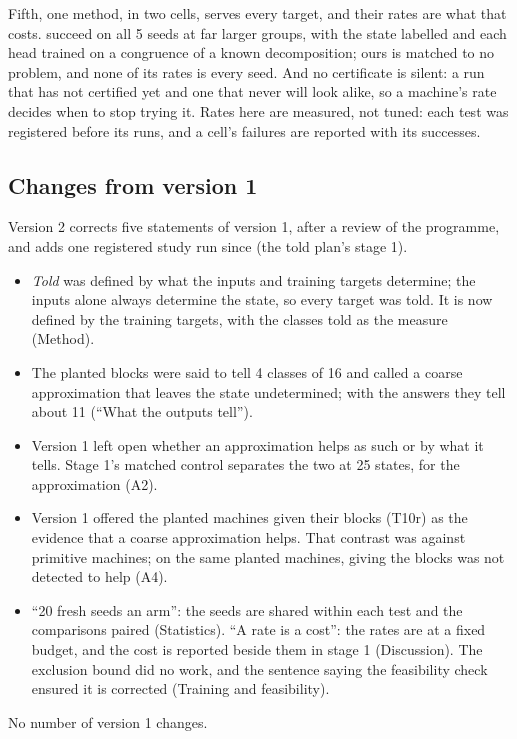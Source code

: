 \documentclass[11pt]{article}
\begin{document}
Fifth, one method, in two cells, serves every target, and their rates are what that costs.
\citet{brandoit-2026-length-independent-state-tracking} succeed on all 5 seeds at far larger groups,
with the state labelled and each head trained on a congruence of a known decomposition; ours is matched to no problem,
and none of its rates is every seed. And no certificate is silent: a run that has not certified yet
and one that never will look alike, so a machine's rate decides when to stop trying it. Rates here
are measured, not tuned: each test was registered before its runs, and a cell's failures are
reported with its successes.

\subsection*{Changes from version 1}

Version 2 corrects five statements of version 1, after a review of the programme, and adds one
registered study run since (the told plan's stage 1).
\begin{itemize}
\item \emph{Told} was defined by what the inputs and training targets determine; the inputs alone
  always determine the state, so every target was told. It is now defined by the training targets,
  with the classes told as the measure (Method).
\item The planted blocks were said to tell 4 classes of 16 and called a coarse approximation that
  leaves the state undetermined; with the answers they tell about 11 (``What the outputs tell'').
\item Version 1 left open whether an approximation helps as such or by what it tells. Stage 1's
  matched control separates the two at 25 states, for the approximation (A2).
\item Version 1 offered the planted machines given their blocks (T10r) as the evidence that a coarse
  approximation helps. That contrast was against primitive machines; on the same planted machines,
  giving the blocks was not detected to help (A4).
\item ``20 fresh seeds an arm'': the seeds are shared within each test and the comparisons paired
  (Statistics). ``A rate is a cost'': the rates are at a fixed budget, and the cost is reported beside
  them in stage 1 (Discussion). The exclusion bound did no work, and the sentence saying the
  feasibility check ensured it is corrected (Training and feasibility).
\end{itemize}
No number of version 1 changes.
\end{document}
